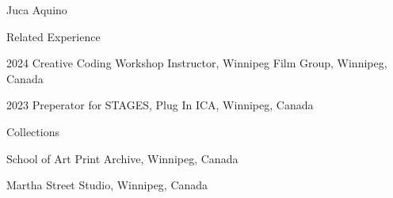 \documentclass[letterpaper, 12pt]{article}
\begin{document}
\begin{cv}{Juca Aquino}
\begin{cvlist}{Related Experience}
\item[2024] Creative Coding Workshop Instructor, Winnipeg Film Group, Winnipeg, Canada
\item[2023] Preperator for STAGES, Plug In ICA, Winnipeg, Canada
\end{cvlist}

\begin{cvlist}{Collections}
\item[School of Art Print Archive, Winnipeg, Canada]
\item[Martha Street Studio, Winnipeg, Canada]
\end{cvlist}

\end{cv}
\end{document}

